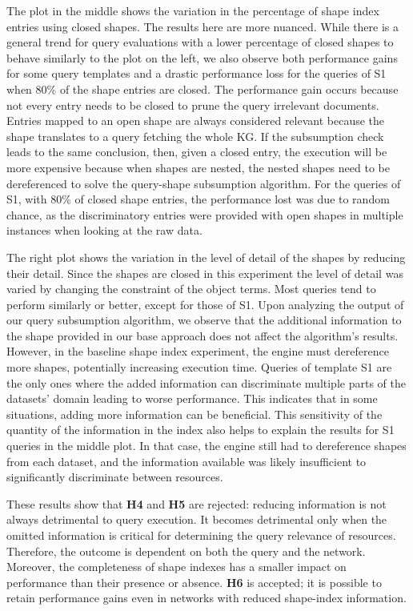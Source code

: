 The plot in the middle shows the variation in the percentage of shape index entries using closed shapes.
The results here are more nuanced.
While there is a general trend for query evaluations with a lower percentage of closed shapes to behave similarly to the plot on the left, we also observe both performance gains for some query templates and a drastic performance loss for the queries of S1 when 80\% of the shape entries are closed.
The performance gain occurs because not every entry needs to be closed to prune the query irrelevant documents.
Entries mapped to an open shape are always considered relevant because the shape translates to a query fetching the whole KG.
If the subsumption check leads to the same conclusion, then, given a closed entry, the execution will be more expensive because 
when shapes are nested, the nested shapes need to be dereferenced to solve the query-shape subsumption algorithm.
For the queries of S1, with 80\% of closed shape entries, the performance lost was due to random chance, as the discriminatory entries were provided with open shapes in multiple instances when looking at the raw data.

The right plot shows the variation in the level of detail of the shapes by reducing their detail.
Since the shapes are closed in this experiment the level of detail was varied by changing the constraint of the object terms.
Most queries tend to perform similarly or better, except for those of S1.
Upon analyzing the output of our query subsumption algorithm, we observe that the additional information to the shape provided in our base approach does not affect the algorithm's results.
However, in the baseline shape index experiment, the engine must dereference more shapes, potentially increasing execution time.
Queries of template S1 are the only ones where the added information can discriminate multiple parts of the datasets' domain leading to worse performance.
This indicates that in some situations, adding more information can be beneficial.
This sensitivity of the quantity of the information in the index also helps to explain the results for S1 queries in the middle plot. 
In that case, the engine still had to dereference shapes from each dataset, and the information available was likely insufficient to significantly discriminate between resources.

These results show that \textbf{H4} and \textbf{H5} are rejected: reducing information is not always detrimental to query execution.
It becomes detrimental only when the omitted information is critical for determining the query relevance of resources. 
Therefore, the outcome is dependent on both the query and the network. 
Moreover, the completeness of shape indexes has a smaller impact on performance than their presence or absence.
\textbf{H6} is accepted; it is possible to retain performance gains even in networks with reduced shape-index information.


